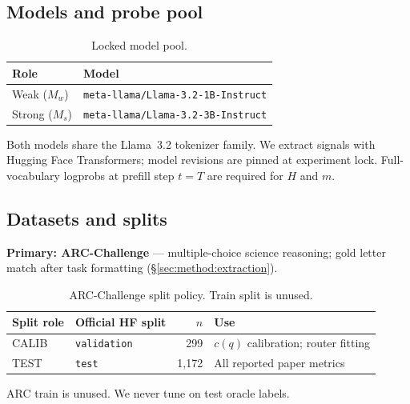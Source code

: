 

\subsection{Models and probe pool}
\label{sec:setup:models}

\begin{table}[t]
  \centering
  \small
  \begin{tabular}{ll}
    \toprule
    \textbf{Role} & \textbf{Model} \\
    \midrule
    Weak ($M_w$) & \texttt{meta-llama/Llama-3.2-1B-Instruct} \\
    Strong ($M_s$) & \texttt{meta-llama/Llama-3.2-3B-Instruct} \\
    \bottomrule
  \end{tabular}
  \caption{Locked model pool.}
  \label{tab:pool}
\end{table}

Both models share the Llama~3.2 tokenizer family.
We extract signals with Hugging Face Transformers; model revisions are pinned at experiment lock.
Full-vocabulary logprobs at prefill step $t=T$ are required for $H$ and $m$.

\subsection{Datasets and splits}
\label{sec:setup:splits}

\textbf{Primary: ARC-Challenge} \citep{clark2018think} --- multiple-choice science reasoning; gold letter match after task formatting (\S\ref{sec:method:extraction}).

\begin{table}[t]
  \centering
  \small
  \begin{tabular}{llrl}
    \toprule
    \textbf{Split role} & \textbf{Official HF split} & \textbf{$n$} & \textbf{Use} \\
    \midrule
    CALIB & \texttt{validation} & 299 & $c(q)$ calibration; router fitting \\
    TEST  & \texttt{test}       & 1{,}172 & All reported paper metrics \\
    \bottomrule
  \end{tabular}
  \caption{ARC-Challenge split policy. Train split is unused.}
  \label{tab:splits}
\end{table}

ARC train is unused.
We never tune on test oracle labels.

